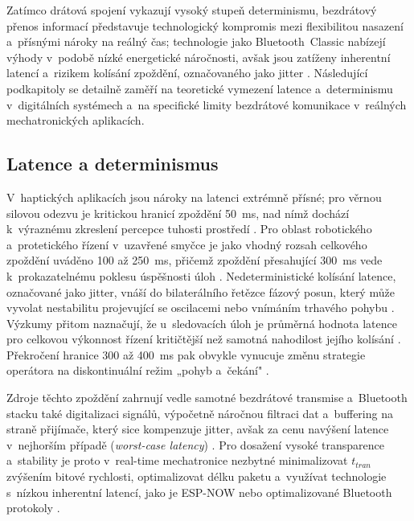\documentclass[FZS,DP]{tulthesis}
\begin{document}
Zatímco drátová spojení vykazují vysoký stupeň determinismu, bezdrátový přenos informací představuje technologický kompromis mezi flexibilitou nasazení a~přísnými nároky na reálný čas; technologie jako Bluetooth~Classic nabízejí výhody v~podobě nízké energetické náročnosti, avšak jsou zatíženy inherentní latencí a~rizikem kolísání zpoždění, označovaného jako jitter \cite{Aijaz2018, Eridani2021918, Bolarinwa2022, Suman2025}.
Následující podkapitoly se detailně zaměří na teoretické vymezení latence a~determinismu v~digitálních systémech a~na specifické limity bezdrátové komunikace v~reálných mechatronických aplikacích.
\subsection{Latence a determinismus}
V~haptických aplikacích jsou nároky na latenci extrémně přísné; pro věrnou silovou odezvu je kritickou hranicí zpoždění 50~ms, nad nímž dochází k~výraznému zkreslení percepce tuhosti prostředí \cite{Patel2022, Suman2025, Almeida202098}.
Pro oblast robotického a~protetického řízení v~uzavřené smyčce je jako vhodný rozsah celkového zpoždění uváděno 100 až 250~ms, přičemž zpoždění přesahující 300~ms vede k~prokazatelnému poklesu úspěšnosti úloh \cite{Song2023823, Almeida202098}.
Nedeterministické kolísání latence, označované jako jitter, vnáší do bilaterálního řetězce fázový posun, který může vyvolat nestabilitu projevující se oscilacemi nebo vnímáním trhavého pohybu \cite{Patel2022, Black2025}.
Výzkumy přitom naznačují, že u~sledovacích úloh je průměrná hodnota latence pro celkovou výkonnost řízení kritičtější než samotná nahodilost jejího kolísání \cite{Suman2025}.
Překročení hranice 300 až 400~ms pak obvykle vynucuje změnu strategie operátora na diskontinuální režim „pohyb a~čekání" \cite{Suman2025, Bolarinwa2022, AlSaadi2023313, Almeida202098}.

Zdroje těchto zpoždění zahrnují vedle samotné bezdrátové transmise a~Bluetooth stacku také digitalizaci signálů, výpočetně náročnou filtraci dat a~buffering na straně přijímače, který sice kompenzuje jitter, avšak za cenu navýšení latence v~nejhorším případě (\textit{worst-case latency}) \cite{Patel2022, Kos2018, Suman2025}.
Pro dosažení vysoké transparence a~stability je proto v~real-time mechatronice nezbytné minimalizovat $t_{tran}$ zvýšením bitové rychlosti, optimalizovat délku paketu a~využívat technologie s~nízkou inherentní latencí, jako je ESP-NOW nebo optimalizované Bluetooth protokoly \cite{Kos2018, Eridani2021918, Papakonstantinou20251218}.
\end{document}
